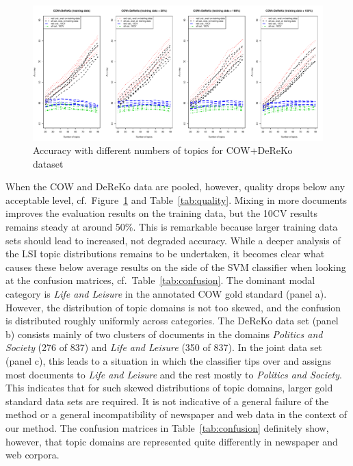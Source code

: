 \documentclass[11pt]{article}
\begin{document}
\begin{figure}[h]
  \centering
  \includegraphics[width=\textwidth]{graphics/coreko.pdf}
  \caption{Accuracy with different numbers of topics for COW+DeReKo dataset}
  \label{fig:coreko}
\end{figure}

When the COW and DeReKo data are pooled, however, quality drops below any acceptable level, cf.\ Figure~\ref{fig:coreko} and Table~\ref{tab:quality}.
Mixing in more documents improves the evaluation results on the training data, but the 10CV results remains steady at around 50\%.
This is remarkable because larger training data sets should lead to increased, not degraded accuracy.
While a deeper analysis of the LSI topic distributions remains to be undertaken, it becomes clear what causes these below average results on the side of the SVM classifier when looking at the confusion matrices, cf.\ Table~\ref{tab:confusion}.
The dominant modal category is \textit{Life and Leisure} in the annotated COW gold standard (panel a).
However, the distribution of topic domains is not too skewed, and the confusion is distributed roughly uniformly across categories.
The DeReKo data set (panel b) consists mainly of two clusters of documents in the domains \textit{Politics and Society} (276 of 837) and \textit{Life and Leisure} (350 of 837).
In the joint data set (panel c), this leads to a situation in which the classifier tips over and assigns most documents to \textit{Life and Leisure} and the rest mostly to \textit{Politics and Society}.
This indicates that for such skewed distributions of topic domains, larger gold standard data sets are required.
It is not indicative of a general failure of the method or a general incompatibility of newspaper and web data in the context of our method.
The confusion matrices in Table~\ref{tab:confusion} definitely show, however, that topic domains are represented quite differently in newspaper and web corpora.
\end{document}
